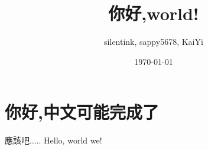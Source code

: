 \documentclass[UTF8,12pt,a4paper]{article}
\title{你好,world!}
\author{silentink, sappy5678, KaiYi}
\date{\today}
\begin{document}
\maketitle
\section{你好,中文可能完成了}
應該吧.....
Hello, world we!
\end{document}
